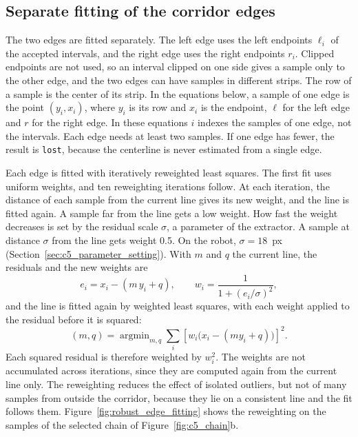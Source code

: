 \subsection{Separate fitting of the corridor edges}
\label{sec:c5_fitting}

The two edges are fitted separately. The left edge uses the left endpoints $\ell_i$ of the accepted intervals, and the right edge uses the right endpoints $r_i$. Clipped endpoints are not used, so an interval clipped on one side gives a sample only to the other edge, and the two edges can have samples in different strips. The row of a sample is the center of its strip. In the equations below, a sample of one edge is the point $(y_i,x_i)$, where $y_i$ is its row and $x_i$ is the endpoint, $\ell$ for the left edge and $r$ for the right edge. In these equations $i$ indexes the samples of one edge, not the intervals. Each edge needs at least two samples. If one edge has fewer, the result is \texttt{lost}, because the centerline is never estimated from a single edge.

Each edge is fitted with iteratively reweighted least squares. The first fit uses uniform weights, and ten reweighting iterations follow. At each iteration, the distance of each sample from the current line gives its new weight, and the line is fitted again. A sample far from the line gets a low weight. How fast the weight decreases is set by the residual scale $\sigma$, a parameter of the extractor. A sample at distance $\sigma$ from the line gets weight 0.5. On the robot, $\sigma=18$~px (Section~\ref{sec:c5_parameter_setting}). With $m$ and $q$ the current line, the residuals and the new weights are
\begin{equation}
    e_i=x_i-(m\,y_i+q),\qquad
    w_i=\frac{1}{1+(e_i/\sigma)^2},
    \label{eq:c5_reweight}
\end{equation}
and the line is fitted again by weighted least squares, with each weight applied to the residual before it is squared:
\begin{equation}
    (m,q)=\mathop{\arg\min}_{m,q}
        \sum_i \left[w_i\bigl(x_i-(my_i+q)\bigr)\right]^2.
    \label{eq:c5_objective}
\end{equation}
Each squared residual is therefore weighted by $w_i^2$. The weights are not accumulated across iterations, since they are computed again from the current line only. The reweighting reduces the effect of isolated outliers, but not of many samples from outside the corridor, because they lie on a consistent line and the fit follows them. Figure~\ref{fig:robust_edge_fitting} shows the reweighting on the samples of the selected chain of Figure~\ref{fig:c5_chain}b.

